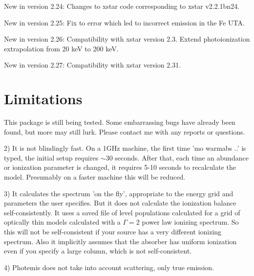 New in version 2.24:  Changes to xstar code corresponding to xstar v2.2.1bn24.

New in version 2.25:  Fix to error which led to incorrect emission in the Fe UTA.

New in version 2.26:  Compatibility with xstar version 2.3.  Extend photoionization 
extrapolation from 20 keV to 200 keV.

New in version 2.27:  Compatibility with xstar version 2.31. 

\section{Limitations}

This package is still being tested.  Some embarrassing bugs have already been found, 
but more may still lurk.  Please contact me with any reports or questions.

2) It is not blindingly fast.  On a 1GHz machine, the first time
'mo warmabs ..' is typed, the initial setup requires $\sim$30 seconds.
After that, each time an abundance or ionization parameter is changed, 
it requires 5-10 seconds to recalculate the model.  Presumably 
on a faster machine this will be reduced.

3) It calculates the spectrum 'on the fly', appropriate to the energy grid
and parameters the user specifies.  But it does not calculate the 
ionization balance self-consistently.  It uses a saved file of 
level populations calculated for a grid of optically thin models calculated
with a $\Gamma=2$ power law ionizing spectrum.  So this will not be self-consistent 
if your source has a very different ionizing spectrum.  Also it implicitly 
assumes that the absorber has uniform ionization even if you specify 
a large column, which is not self-consistent.

4) Photemis does not take into account scattering, only true emission.

